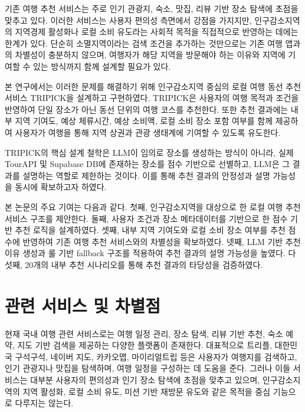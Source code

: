 \documentclass[10pt,a4paper]{article}
\begin{document}
기존 여행 추천 서비스는 주로 인기 관광지, 숙소, 맛집, 리뷰 기반 장소 탐색에 초점을 맞추고 있다. 이러한 서비스는 사용자 편의성 측면에서 강점을 가지지만, 인구감소지역의 지역경제 활성화나 로컬 소비 유도라는 사회적 목적을 직접적으로 반영하는 데에는 한계가 있다. 단순히 소멸지역이라는 검색 조건을 추가하는 것만으로는 기존 여행 앱과의 차별성이 충분하지 않으며, 여행자가 해당 지역을 방문해야 하는 이유와 지역에 기여할 수 있는 방식까지 함께 설계할 필요가 있다.

본 연구에서는 이러한 문제를 해결하기 위해 인구감소지역 중심의 로컬 여행 동선 추천 서비스 TRIPICK을 설계하고 구현하였다. TRIPICK은 사용자의 여행 목적과 조건을 반영하여 단일 장소가 아닌 동선 단위의 여행 코스를 추천한다. 또한 추천 결과에는 내부 지역 기여도, 예상 체류시간, 예상 소비액, 로컬 소비 장소 포함 여부를 함께 제공하여 사용자가 여행을 통해 지역 상권과 관광 생태계에 기여할 수 있도록 유도한다.

TRIPICK의 핵심 설계 철학은 LLM이 임의로 장소를 생성하는 방식이 아니라, 실제 TourAPI 및 Supabase DB에 존재하는 장소를 점수 기반으로 선별하고, LLM은 그 결과를 설명하는 역할로 제한하는 것이다. 이를 통해 추천 결과의 안정성과 설명 가능성을 동시에 확보하고자 하였다.

본 논문의 주요 기여는 다음과 같다. 첫째, 인구감소지역을 대상으로 한 로컬 여행 추천 서비스 구조를 제안한다. 둘째, 사용자 조건과 장소 메타데이터를 기반으로 한 점수 기반 추천 로직을 설계하였다. 셋째, 내부 지역 기여도와 로컬 소비 장소 여부를 추천 점수에 반영하여 기존 여행 추천 서비스와의 차별성을 확보하였다. 넷째, LLM 기반 추천 이유 생성과 룰 기반 fallback 구조를 적용하여 추천 결과의 설명 가능성을 높였다. 다섯째, 20개의 내부 추천 시나리오를 통해 추천 결과의 타당성을 검증하였다.

\section{관련 서비스 및 차별점}

현재 국내 여행 관련 서비스로는 여행 일정 관리, 장소 탐색, 리뷰 기반 추천, 숙소 예약, 지도 기반 검색을 제공하는 다양한 플랫폼이 존재한다. 대표적으로 트리플, 대한민국 구석구석, 네이버 지도, 카카오맵, 마이리얼트립 등은 사용자가 여행지를 검색하고, 인기 관광지나 맛집을 탐색하며, 여행 일정을 구성하는 데 도움을 준다. 그러나 이들 서비스는 대부분 사용자의 편의성과 인기 장소 탐색에 초점을 맞추고 있으며, 인구감소지역의 지역 활성화, 로컬 소비 유도, 미션 기반 재방문 유도와 같은 목적을 중심 기능으로 다루지는 않는다.
\end{document}
